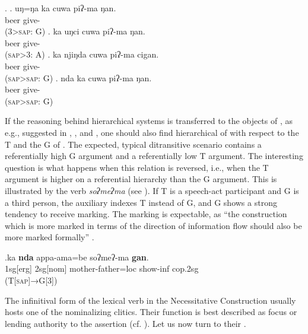 \ex. \ag.  uŋ=ŋa ka cuwa piʔ-ma  ŋan.\\
    beer  give- \\
 (3>\textsc{sap}: G) 
\bg. ka uŋci cuwa  piʔ-ma ŋan.\\
  beer  give- \\
 (\textsc{sap}>3: A)
\bg. ka njiŋda cuwa piʔ-ma  cigan.\\
  beer give- \\ 
	(\textsc{sap}>\textsc{sap}: G)
\bg. nda ka cuwa piʔ-ma  ŋan.\\
  beer give- \\ 
	(\textsc{sap}>\textsc{sap}: G)


\largerpage[-1]
If the reasoning behind hierarchical  systems is transferred to the objects of , as e.g., suggested in \citet{Haspelmath2004Explaining}, \citet{Malchukovetal2010Ditrans-overview}, and \citet{ Siewierska2003Person}, one should also find hierarchical  of  with respect to the T and the G of . The expected, typical ditransitive scenario contains a referentially high G argument and a referentially low T argument. The interesting question is what happens when this relation is reversed, i.e., when the T argument is higher on a referential hierarchy than the G argument. This is illustrated by the verb \emph{soʔmeʔma}   (see \Next). If T is a speech-act participant  and G is a third person, the auxiliary indexes T instead of G, and G shows a strong tendency to receive   marking. The   marking is expectable, as “the construction which is more marked in terms of the direction of information flow should also be more marked formally” \citep[128]{Comrie1989Language}. 

\exg.ka \textbf{nda} appa-ama=be soʔmeʔ-ma \textbf{gan}.\\
		 {\sc 1sg[erg]}  {\sc 2sg[nom]}  mother-father{\sc =loc} show{\sc -inf} {\sc cop.2sg}\\
		 (T[\textsc{sap}]→G[3])
		


\largerpage[-1]
The infinitival form of the lexical verb  in the Necessitative Construction usually hosts one of the nominalizing clitics. Their  function is best described as focus or lending authority to the assertion (cf. ). Let us now turn to their . 


